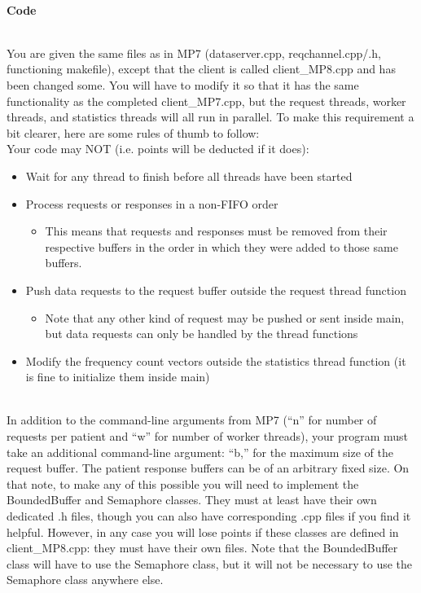\documentclass[12pt]{extarticle}
\newenvironment{myindentpar}[1]%
 {\begin{list}{}%
         {\setlength{\leftmargin}{#1}}%
         \item[]%
 }
 {\end{list}}
\begin{document}
\begin{myindentpar}{5mm}

	\ \\
    \textbf{Code}	

	\ \\
	You are given the same files as in MP7 (dataserver.cpp, reqchannel.cpp/.h, functioning makefile), except that the client is called client\_MP8.cpp and has been changed some. You will have to modify it so that it has the same functionality as the completed client\_MP7.cpp, but the request threads, worker threads, and statistics threads will all run in parallel. To make this requirement a bit clearer, here are some rules of thumb to follow:
	\ \\
	Your code may NOT (i.e. points will be deducted if it does):
	\begin{itemize}
		\setlength\itemsep{-0.1em}
		\item Wait for any thread to finish before all threads have been started
		\item Process requests or responses in a non-FIFO order 
			\begin{itemize}
			\setlength\itemsep{-0.1em}
			\item This means that requests and responses must be removed from their respective buffers in the order in which they were added to those same buffers.
			\end{itemize}
		\item Push data requests to the request buffer outside the request thread function 
			\begin{itemize}
			\setlength\itemsep{-0.1em}
			\item Note that any other kind of request may be pushed or sent inside main, but data requests can only be handled by the thread functions
			\end{itemize}
		\item Modify the frequency count vectors outside the statistics thread function (it is fine to initialize them inside main)
	\end{itemize}

	\ \\
	In addition to the command-line arguments from MP7 (“n” for number of requests per patient and “w” for number of worker threads), your program must take an additional command-line argument: “b,” for the maximum size of the request buffer. The patient response buffers can be of an arbitrary fixed size.
On that note, to make any of this possible you will need to implement the BoundedBuffer and Semaphore classes. They must at least have their own dedicated .h files, though you can also have corresponding .cpp files if you find it helpful. However, in any case you will lose points if these classes are defined in client\_MP8.cpp: they must have their own files. Note that the BoundedBuffer class will have to use the Semaphore class, but it will not be necessary to use the Semaphore class anywhere else.


\end{myindentpar}
\end{document}
